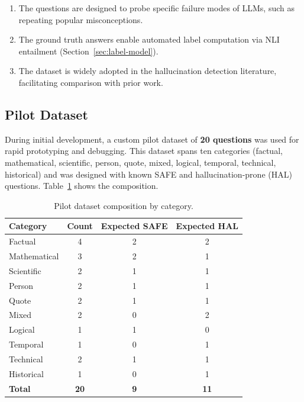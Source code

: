 \begin{enumerate}
    \item The questions are designed to probe specific failure modes of LLMs, such as repeating popular misconceptions.
    \item The ground truth answers enable automated label computation via NLI entailment (Section~\ref{sec:label-model}).
    \item The dataset is widely adopted in the hallucination detection literature, facilitating comparison with prior work.
\end{enumerate}

\subsection{Pilot Dataset}
\label{sec:pilot-dataset}

During initial development, a custom pilot dataset of \textbf{20 questions} was used for rapid prototyping and debugging. This dataset spans ten categories (factual, mathematical, scientific, person, quote, mixed, logical, temporal, technical, historical) and was designed with known SAFE and hallucination-prone (HAL) questions. Table~\ref{tab:pilot-dataset} shows the composition.

\begin{table}[!htbp]
    \centering
    \caption{Pilot dataset composition by category.}
    \label{tab:pilot-dataset}
    \begin{tabular}{lccc}
        \toprule
        \textbf{Category} & \textbf{Count} & \textbf{Expected SAFE} & \textbf{Expected HAL} \\
        \midrule
        Factual      & 4 & 2 & 2 \\
        Mathematical  & 3 & 2 & 1 \\
        Scientific    & 2 & 1 & 1 \\
        Person        & 2 & 1 & 1 \\
        Quote         & 2 & 1 & 1 \\
        Mixed         & 2 & 0 & 2 \\
        Logical       & 1 & 1 & 0 \\
        Temporal      & 1 & 0 & 1 \\
        Technical     & 2 & 1 & 1 \\
        Historical    & 1 & 0 & 1 \\
        \midrule
        \textbf{Total} & \textbf{20} & \textbf{9} & \textbf{11} \\
        \bottomrule
    \end{tabular}
\end{table}

